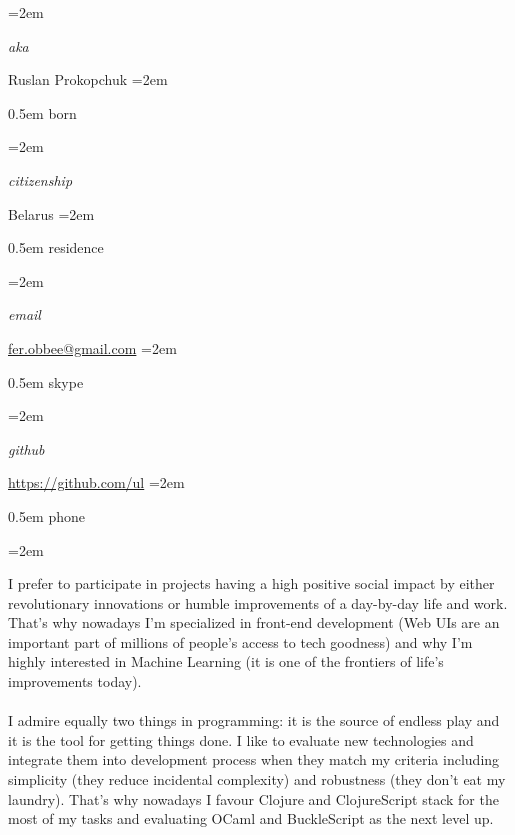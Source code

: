 \documentclass{scrartcl}
\newlength{\datebox}\settowidth{\datebox}{Spring 2011} %
\newcommand{\NewEntry}[3]{\noindent\hangindent=2em\hangafter=0 \parbox{\datebox}{\small \textit{#1}}\hspace{1.5em} #2 #3 %
\vspace{0.5em}} %
\newcommand{\Description}[1]{\hangindent=2em\hangafter=0\noindent\raggedright\footnotesize{#1}\par\normalsize\vspace{1em}} %
\begin{document}
\thispagestyle{empty} %


\begin{cv}{}\vspace{1.5em} %

\noindent{}\vspace{0.5em} %

\NewEntry{aka}{Ruslan Prokopchuk}

\NewEntry{born}{18 April 1988} %

\NewEntry{citizenship}{Belarus} %

\NewEntry{residence}{Sydney, Australia} %

\NewEntry{email}{\href{mailto:fer.obbee@gmail.com}{fer.obbee@gmail.com}} %

\NewEntry{skype}{ruslan.prokopchuk} %

\NewEntry{github}{\href{https://github.com/ul}{https://github.com/ul}} %

\NewEntry{phone}{+61 408 703 246} %

\vspace{1em} %

\noindent{}\vspace{1em} %

\Description{I prefer to participate in projects having a high positive social impact by either revolutionary innovations or humble improvements of a day-by-day life and work. That's why nowadays I'm specialized in front-end development (Web UIs are an important part of millions of people's access to tech goodness)  and why I'm highly interested in Machine Learning (it is one of the frontiers of life's improvements today).
\\\ \\
I admire equally two things in programming: it is the source of endless play and
it is the tool for getting things done. I like to evaluate new technologies and
integrate them into development process when they match my criteria including
simplicity (they reduce incidental complexity) and robustness (they don't eat my
laundry).  That's why nowadays I favour Clojure and ClojureScript stack for the
most of my tasks and evaluating OCaml and BuckleScript as the next level up.}\vspace{2em} %


\end{cv}
\end{document}
